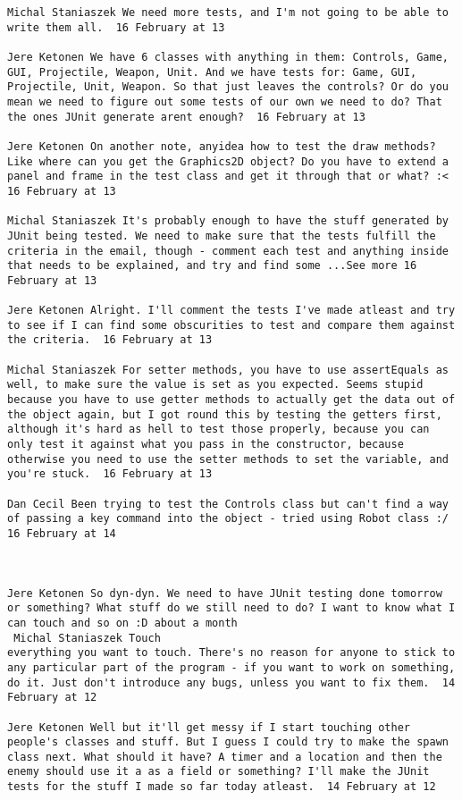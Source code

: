 \documentclass[10pt]{report}
\begin{document}
\begin{verbatim}
Michal Staniaszek We need more tests, and I'm not going to be able to
write them all.  16 February at 13

Jere Ketonen We have 6 classes with anything in them: Controls, Game,
GUI, Projectile, Weapon, Unit. And we have tests for: Game, GUI,
Projectile, Unit, Weapon. So that just leaves the controls? Or do you
mean we need to figure out some tests of our own we need to do? That
the ones JUnit generate arent enough?  16 February at 13

Jere Ketonen On another note, anyidea how to test the draw methods?
Like where can you get the Graphics2D object? Do you have to extend a
panel and frame in the test class and get it through that or what? :<
16 February at 13

Michal Staniaszek It's probably enough to have the stuff generated by
JUnit being tested. We need to make sure that the tests fulfill the
criteria in the email, though - comment each test and anything inside
that needs to be explained, and try and find some ...See more 16
February at 13

Jere Ketonen Alright. I'll comment the tests I've made atleast and try
to see if I can find some obscurities to test and compare them against
the criteria.  16 February at 13

Michal Staniaszek For setter methods, you have to use assertEquals as
well, to make sure the value is set as you expected. Seems stupid
because you have to use getter methods to actually get the data out of
the object again, but I got round this by testing the getters first,
although it's hard as hell to test those properly, because you can
only test it against what you pass in the constructor, because
otherwise you need to use the setter methods to set the variable, and
you're stuck.  16 February at 13

Dan Cecil Been trying to test the Controls class but can't find a way
of passing a key command into the object - tried using Robot class :/
16 February at 14



Jere Ketonen So dyn-dyn. We need to have JUnit testing done tomorrow
or something? What stuff do we still need to do? I want to know what I
can touch and so on :D about a month 
 Michal Staniaszek Touch
everything you want to touch. There's no reason for anyone to stick to
any particular part of the program - if you want to work on something,
do it. Just don't introduce any bugs, unless you want to fix them.  14
February at 12

Jere Ketonen Well but it'll get messy if I start touching other
people's classes and stuff. But I guess I could try to make the spawn
class next. What should it have? A timer and a location and then the
enemy should use it a as a field or something? I'll make the JUnit
tests for the stuff I made so far today atleast.  14 February at 12


\end{verbatim}
\end{document}
